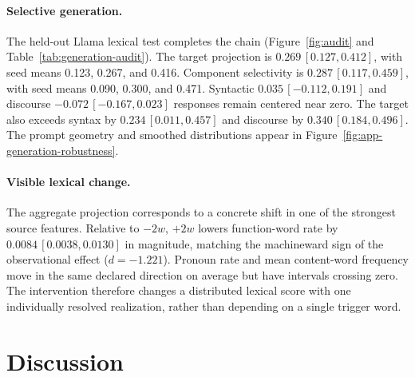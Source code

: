 \paragraph{Selective generation.} The held-out Llama lexical test completes the chain (Figure~\ref{fig:audit} and Table~\ref{tab:generation-audit}). The target projection is \(0.269\,[0.127,0.412]\), with seed means 0.123, 0.267, and 0.416. Component selectivity is \(0.287\,[0.117,0.459]\), with seed means 0.090, 0.300, and 0.471. Syntactic \(0.035\,[{-}0.112,0.191]\) and discourse \(-0.072\,[{-}0.167,0.023]\) responses remain centered near zero. The target also exceeds syntax by \(0.234\,[0.011,0.457]\) and discourse by \(0.340\,[0.184,0.496]\). The prompt geometry and smoothed distributions appear in Figure~\ref{fig:app-generation-robustness}.

\paragraph{Visible lexical change.} The aggregate projection corresponds to a concrete shift in one of the strongest source features. Relative to \(-2w\), \(+2w\) lowers function-word rate by \(0.0084\,[0.0038,0.0130]\) in magnitude, matching the machineward sign of the observational effect (\(d=-1.221\)). Pronoun rate and mean content-word frequency move in the same declared direction on average but have intervals crossing zero. The intervention therefore changes a distributed lexical score with one individually resolved realization, rather than depending on a single trigger word.

\section{Discussion}

